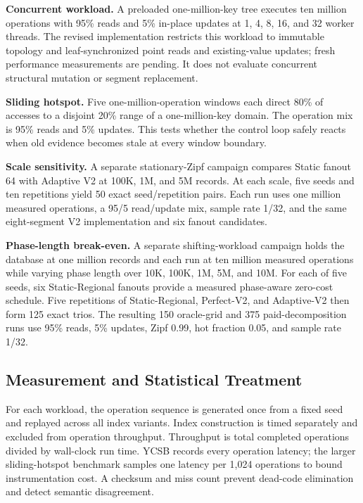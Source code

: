\documentclass[sigconf,review,anonymous]{acmart}
\begin{document}
\textbf{Concurrent workload.}  A preloaded one-million-key tree
executes ten million operations with 95\% reads and 5\% in-place updates at 1,
4, 8, 16, and 32 worker threads.  The revised implementation restricts this
workload to immutable topology and leaf-synchronized point reads and
existing-value updates; fresh performance measurements are pending.  It does
not evaluate concurrent structural mutation or segment replacement.

\textbf{Sliding hotspot.}  Five one-million-operation windows each direct
80\% of accesses to a disjoint 20\% range of a one-million-key domain.  The
operation mix is 95\% reads and 5\% updates.  This tests whether the control
loop safely reacts when old evidence becomes stale at every window boundary.

\textbf{Scale sensitivity.}  A separate stationary-Zipf campaign compares
Static fanout 64 with Adaptive V2 at 100K, 1M, and 5M records.  At each scale,
five seeds and ten repetitions yield 50 exact seed/repetition pairs.  Each run
uses one million measured operations, a 95/5 read/update mix, sample rate 1/32,
and the same eight-segment V2 implementation and six fanout candidates.

\textbf{Phase-length break-even.}  A separate shifting-workload campaign
holds the database at one million records and each run at ten million measured
operations while varying phase length over 10K, 100K, 1M, 5M, and 10M.
For each of five seeds, six Static-Regional fanouts provide a measured
phase-aware zero-cost schedule.  Five repetitions of Static-Regional,
Perfect-V2, and Adaptive-V2 then form 125 exact trios.  The resulting 150
oracle-grid and 375 paid-decomposition runs use 95\% reads, 5\% updates,
Zipf 0.99, hot fraction 0.05, and sample rate 1/32.

\subsection{Measurement and Statistical Treatment}

For each workload, the operation sequence is generated once from a fixed seed
and replayed across all index variants.  Index construction is timed
separately and excluded from operation throughput.  Throughput is total
completed operations divided by wall-clock run time.  YCSB records every
operation latency; the larger sliding-hotspot benchmark samples one latency
per 1,024 operations to bound instrumentation cost.  A checksum and miss count
prevent dead-code elimination and detect semantic disagreement.
\end{document}
